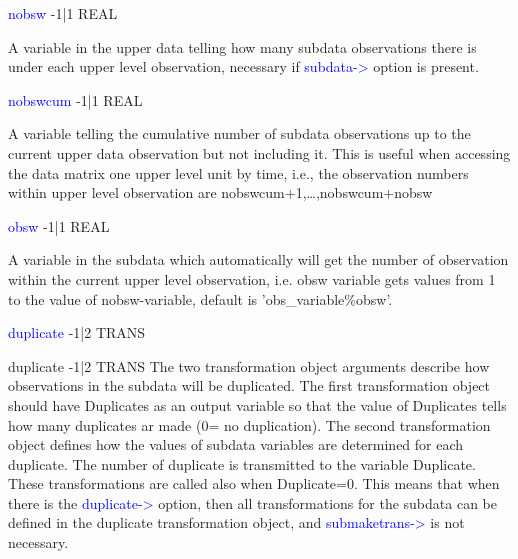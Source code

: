 \vspace{0.3cm}
\hline
\vspace{0.3cm}
\noindent \textcolor{blue}{nobsw}  \tabto{3cm}  -1|1  \tabto{5cm}  REAL \tabto{7cm}
\begin{changemargin}{3cm}{0cm}
\noindent  A variable in the upper data telling how many subdata observations there is under
each upper level observation, necessary if \textcolor{blue}{subdata->} option is present.

\end{changemargin}
\vspace{0.3cm}
\hline
\vspace{0.3cm}
\noindent \textcolor{blue}{nobswcum} \tabto{3cm} -1|1 \tabto{5cm}  REAL \tabto{7cm}
\begin{changemargin}{3cm}{0cm}
\noindent  A variable telling the cumulative number of subdata observations up to the
current upper data observation but not including it. This is useful when accessing
the data matrix one upper level unit by time, i.e., the observation numbers within
upper level observation are nobswcum+1,…,nobswcum+nobsw

\end{changemargin}
\vspace{0.3cm}
\hline
\vspace{0.3cm}
\noindent \textcolor{blue}{obsw} \tabto{3cm} -1|1 \tabto{5cm}   REAL  \tabto{7cm}
\begin{changemargin}{3cm}{0cm}
\noindent  A variable in the subdata which automatically will get the number of observation
within the current upper level observation, i.e. obsw variable gets values from 1
to the value of nobsw-variable, default is 'obs\_variable\%obsw'.

\end{changemargin}
\vspace{0.3cm}
\hline
\vspace{0.3cm}
\noindent \textcolor{blue}{duplicate} \tabto{3cm} -1|2 \tabto{5cm}   TRANS  \tabto{7cm}
\begin{changemargin}{3cm}{0cm}
\noindent \noindent duplicate \tabto{3cm} -1|2 \tabto{5cm}   TRANS  \tabto{7cm}
The two transformation object arguments describe how observations in the subdata
will be duplicated. The first transformation object should have Duplicates as an
output variable so that the value of Duplicates tells how many duplicates ar
made (0= no duplication). The second transformation object defines how the values
of subdata variables are determined for each duplicate. The number of duplicate
is transmitted to the variable Duplicate. These transformations are called also
when Duplicate=0. This means that when there is the \textcolor{blue}{duplicate->} option,
then all transformations for the subdata can be defined in the duplicate
transformation object, and \textcolor{blue}{submaketrans->} is not necessary.

\end{changemargin}
